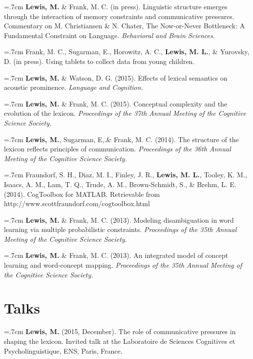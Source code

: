\documentclass[letterpaper]{article}
\begin{document}
 \hangindent=.7cm {\bf Lewis, M.} \& Frank, M. C. (in press). Linguistic structure emerges through the interaction of memory constraints and communicative pressures. Commentary on M. Christiansen & N. Chater, The Now-or-Never Bottleneck: A Fundamental Constraint on Language. {\it Behavioral and Brain Sciences}.

  \hangindent=.7cm Frank, M. C., Sugarman, E., Horowitz, A. C., {\bf Lewis, M. L.}, \& Yurovsky, D. (in press). Using tablets to collect data from young children. 

 \hangindent=.7cm {\bf Lewis, M.} \& Watson, D. G. (2015). Effects of lexical semantics on acoustic prominence. { \it Language and Cognition.}

 \hangindent=.7cm {\bf Lewis, M.} \& Frank, M. C. (2015). Conceptual complexity and the evolution of the lexicon. { \it Proceedings of the 37th Annual Meeting of the Cognitive Science Society.}
 
 \hangindent=.7cm {\bf Lewis, M.}, Sugarman, E,.\& Frank, M. C. (2014). The structure of the lexicon reflects principles of communication. { \it Proceedings of the 36th Annual Meeting of the Cognitive Science Society.}
  
  \hangindent=.7cm Fraundorf, S. H., Diaz, M. I., Finley, J. R., {\bf Lewis, M. L.}, Tooley, K. M., Isaacs, A. M., Lam, T. Q., Trude, A. M., Brown-Schmidt, S., \& Brehm, L. E. (2014). CogToolbox for MATLAB. Retrievable from http://www.scottfraundorf.com/cogtoolbox.html
  
 \hangindent=.7cm {\bf Lewis, M.} \& Frank, M. C. (2013). Modeling disambiguation in word learning via multiple probabilistic constraints. { \it Proceedings of the 35th Annual Meeting of the Cognitive Science Society.}

 \hangindent=.7cm {\bf Lewis, M.} \& Frank, M. C. (2013). An integrated model of concept learning and word-concept mapping.{ \it Proceedings of the 35th Annual Meeting of the Cognitive Science Society.}
 
 
 
\section*{Talks}

\hangindent=.7cm {\bf Lewis, M.} (2015, December). The role of communicative pressures in shaping the lexicon. Invited talk at the Laboratoire de Sciences Cognitives et Psycholinguistique, ENS, Paris, France.
\end{document}
